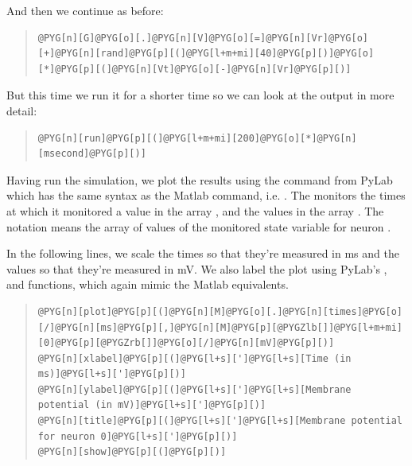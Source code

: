 \documentclass[letterpaper,10pt,english]{manual}
\begin{document}
And then we continue as before:
\begin{quote}

\begin{Verbatim}[commandchars=@\[\]]
@PYG[n][G]@PYG[o][.]@PYG[n][V]@PYG[o][=]@PYG[n][Vr]@PYG[o][+]@PYG[n][rand]@PYG[p][(]@PYG[l+m+mi][40]@PYG[p][)]@PYG[o][*]@PYG[p][(]@PYG[n][Vt]@PYG[o][-]@PYG[n][Vr]@PYG[p][)]
\end{Verbatim}
\end{quote}

But this time we run it for a shorter time so we can look at
the output in more detail:
\begin{quote}

\begin{Verbatim}[commandchars=@\[\]]
@PYG[n][run]@PYG[p][(]@PYG[l+m+mi][200]@PYG[o][*]@PYG[n][msecond]@PYG[p][)]
\end{Verbatim}
\end{quote}

Having run the simulation, we plot the results using the
 command from PyLab which has the same syntax as the Matlab
 command, i.e. . The \hyperlink{brian.StateMonitor}{}
monitors the times at which it monitored a value in the
array , and the values in the array . The notation
 means the array of values of the monitored state
variable for neuron .

In the following lines, we scale the times so that they're
measured in ms and the values so that they're measured in
mV. We also label the plot using PyLab's ,  and
 functions, which again mimic the Matlab equivalents.
\begin{quote}

\begin{Verbatim}[commandchars=@\[\]]
@PYG[n][plot]@PYG[p][(]@PYG[n][M]@PYG[o][.]@PYG[n][times]@PYG[o][/]@PYG[n][ms]@PYG[p][,]@PYG[n][M]@PYG[p][@PYGZlb[]]@PYG[l+m+mi][0]@PYG[p][@PYGZrb[]]@PYG[o][/]@PYG[n][mV]@PYG[p][)]
@PYG[n][xlabel]@PYG[p][(]@PYG[l+s][']@PYG[l+s][Time (in ms)]@PYG[l+s][']@PYG[p][)]
@PYG[n][ylabel]@PYG[p][(]@PYG[l+s][']@PYG[l+s][Membrane potential (in mV)]@PYG[l+s][']@PYG[p][)]
@PYG[n][title]@PYG[p][(]@PYG[l+s][']@PYG[l+s][Membrane potential for neuron 0]@PYG[l+s][']@PYG[p][)]
@PYG[n][show]@PYG[p][(]@PYG[p][)]
\end{Verbatim}
\end{quote}
\end{document}
